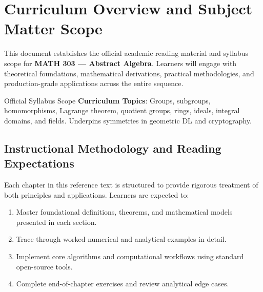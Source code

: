 \section{Curriculum Overview and Subject Matter Scope}

This document establishes the official academic reading material and syllabus scope for \textbf{MATH 303 --- Abstract Algebra}. Learners will engage with theoretical foundations, mathematical derivations, practical methodologies, and production-grade applications across the entire sequence.

\begin{InsightBox}{Official Syllabus Scope}
  \textbf{Curriculum Topics}: Groups, subgroups, homomorphisms, Lagrange theorem, quotient groups, rings, ideals, integral domains, and fields. Underpins symmetries in geometric DL and cryptography.
\end{InsightBox}

\subsection{Instructional Methodology and Reading Expectations}

Each chapter in this reference text is structured to provide rigorous treatment of both principles and applications. Learners are expected to:
\begin{enumerate}
  \item Master foundational definitions, theorems, and mathematical models presented in each section.
  \item Trace through worked numerical and analytical examples in detail.
  \item Implement core algorithms and computational workflows using standard open-source tools.
  \item Complete end-of-chapter exercises and review analytical edge cases.
\end{enumerate}

